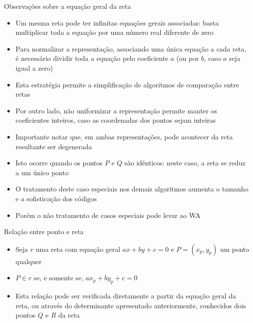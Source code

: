 \begin{frame}[fragile]{Observações sobre a equação geral da reta}

    \begin{itemize}
        \item Um mesma reta pode ter infinitas equações gerais associadas: basta multiplicar toda a equação por uma número real diferente de zero

        \item Para normalizar a representação, associando uma única equação a cada reta, é necessário dividir toda a equação pelo coeficiente $a$ (ou por $b$, caso $a$ seja igual a zero)

        \item Esta estratégia permite a simplificação de algoritmos de comparação entre retas

        \item Por outro lado, não uniformizar a representação permite manter os coeficientes 
            inteiros, caso as coordenadas dos pontos sejam inteiras

        \item Importante notar que, em ambas representações, pode acontecer da reta resultante ser degenerada

        \item Isto ocorre quando os pontos $P$ e $Q$ são idênticos: neste caso, a reta se reduz a um único ponto 

        \item O tratamento deste caso especiais nos demais algoritmos aumenta o tamanho e a sofisticação dos códigos

        \item Porém o não tratamento de casos especiais pode levar ao WA
    \end{itemize}

\end{frame}

\begin{frame}[fragile]{Relação entre ponto e reta}

    \begin{itemize}
        \item Seja $r$ uma reta com equação geral $ax + by + c = 0$ e $P = (x_p, y_p)$ um ponto qualquer
        \item $P\in r$ se, e somente se, $ax_p + by_p + c = 0$

        \item Esta relação pode ser verificada diretamente a partir da equação geral da reta, ou através do determinante apresentado anteriormente, conhecidos dois pontos $Q$ e $R$ da reta

    \end{itemize}

\end{frame}

